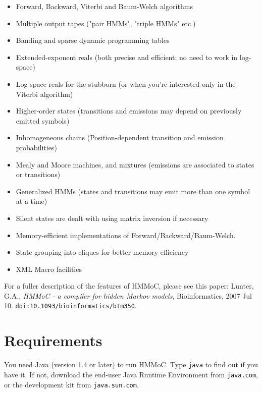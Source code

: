 \documentclass{article}
\def\ignore#1{}
\begin{document}
\begin{itemize}
\item Forward, Backward, Viterbi and Baum-Welch algorithms
\item Multiple output tapes ("pair HMMs", "triple HMMs" etc.)
\item Banding and sparse dynamic programming tables
\item Extended-exponent reals (both precise and efficient; no need to work in log-space)
\item Log space reals for the stubborn (or when you're interested only in the Viterbi algorithm)
\item Higher-order states (transitions and emissions may depend on previously emitted symbols)
\item Inhomogeneous chains (Position-dependent transition and emission probabilities)
\item Mealy and Moore machines, and mixtures (emissions are associated to states or transitions)
\item Generalized HMMs (states and transitions may emit more than one symbol at a time)
\item Silent states are dealt with using matrix inversion if necessary
\item Memory-efficient implementations of Forward/Backward/Baum-Welch.
\item State grouping into cliques for better memory efficiency
\item XML Macro facilities
\end{itemize}
\ignore{
To be included:
\begin{itemize}
\item Partially unobserved output
\item Hirschberg / dynamic traceback Viterbi algorithm
\end{itemize}
}

For a fuller description of the features of HMMoC, please see this paper:
Lunter, G.A., {\it HMMoC - a compiler for hidden Markov models}, Bioinformatics, 2007 Jul 10.
{\tt doi:10.1093/bioinformatics/btm350}.


\section{Requirements}

You need Java (version 1.4 or later) to run HMMoC.  Type {\tt java} to find out 
if you have it. If not, download the end-user Java Runtime Environment from 
{\tt java.com}, or the development kit from {\tt java.sun.com}.
\end{document}
